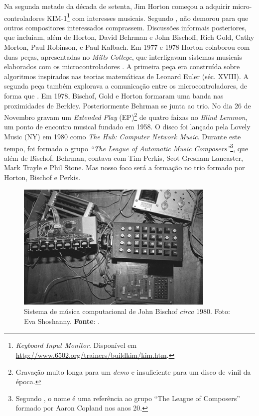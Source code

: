 Na segunda metade da década de setenta, Jim Horton começou a adquirir micro-controladores KIM-1\footnote{\emph{Keyboard Input Monitor}. Disponível em \url{http://www.6502.org/trainers/buildkim/kim.htm}.} com interesses musicais. Segundo , não demorou para que outros compositores interessados comprassem. Discussões informais posteriores, que incluiam, além de Horton, David Behrman e John Bischoff, Rich Gold, Cathy Morton, Paul Robinson, e Paul Kalbach. Em 1977 e 1978  Horton colaborou com duas peças, apresentadas no \emph{Mills College}, que interligavam sistemas musicais elaborados com os microcontroladores . A primeira peça era construída sobre algoritmos inspirados nas teorias matemáticas de Leonard Euler (séc. XVIII). A segunda peça também explorava a comunicação entre os microcontroladores, de forma que . Em 1978, Bischof, Gold e Horton formaram uma banda nas proximidades de Berkley. Posteriormente Behrman se junta ao trio. No dia 26 de Novembro gravam um \emph{Extended Play} (EP)\footnote{Gravação muito longa para um \emph{demo} e insuficiente para um disco de vinil da época.} de quatro faixas no \emph{Blind Lemmon}, um ponto de encontro musical fundado em 1958. O disco foi lançado pela Lovely Music (NY) em 1980 como \emph{The Hub: Computer Network Music}.  Durante este tempo, foi formado o grupo \emph{``The League of Automatic Music Composers''}\footnote{Segundo , o nome é uma referência ao grupo ``The League of Composers'' formado por Aaron Copland nos anos 20.}, que além de  Bischof, Behrman, contava com Tim Perkis, Scot Gresham-Lancaster, Mark Trayle e Phil Stone. Mas nosso foco será a formação no trio formado por Horton, Bischof e Perkis.

\begin{figure}[!h]
  \centering
  \includegraphics[scale=0.7]{imagens/siskim1.jpg}
  \caption{Sistema de música computacional de John Bischof \emph{circa} 1980. Foto: Eva Shoshanny\protect\footnotemark. \textbf{Fonte}: .}
  \label{fig:siskim1}
\end{figure}

